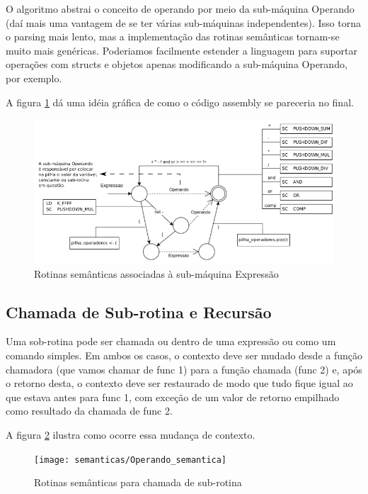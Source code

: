 \documentclass[a4paper,12pt]{report}
\begin{document}
    O algoritmo abstrai o conceito de operando por meio da sub-máquina Operando (daí mais uma vantagem de se ter várias sub-máquinas independentes). Isso torna o parsing mais lento, mas a implementação das rotinas semânticas tornam-se muito mais genéricas. Poderiamos facilmente estender a linguagem para suportar operações com structs e objetos apenas modificando a sub-máquina Operando, por exemplo.

    A figura \ref{fig:ExpSem} dá uma idéia gráfica de como o código assembly se pareceria no final.

    \begin{figure}[h]
        \centering
        \caption{Rotinas semânticas associadas à sub-máquina Expressão}
        \label{fig:ExpSem}
        \includegraphics[scale=.75]{semanticas/exp}
    \end{figure}

    \subsection*{Chamada de Sub-rotina e Recursão}
    Uma sob-rotina pode ser chamada ou dentro de uma expressão ou como um comando simples. Em ambos os casos, o contexto deve ser mudado desde a função chamadora (que vamos chamar de func 1) para a função chamada (func 2) e, após o retorno desta, o contexto deve ser restaurado de modo que tudo fique igual ao que estava antes para func 1, com exceção de um valor de retorno empilhado como resultado da chamada de func 2. 

    A figura \ref{fig:rotinachamadafuncao} ilustra como ocorre essa mudança de contexto.

    \begin{figure}[h]
        \centering
        \caption{Rotinas semânticas para chamada de sub-rotina}
        \label{fig:rotinachamadafuncao}
        \texttt{[image: semanticas/Operando\_semantica]}
    \end{figure}
\end{document}
